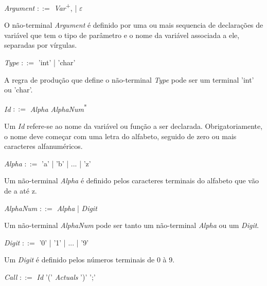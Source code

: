 \documentclass{scrreprt}
\begin{document}
\begin{center}
\textit{Argument }$::=$\textit{ Var}\textsuperscript{+}, | $\varepsilon$
\end{center}

\par O não-terminal \textit{Argument} é definido por uma ou mais sequencia de declarações de variável que tem o tipo de parâmetro e o nome da variável associada a ele, separadas por vírgulas.

\begin{center}
\textit{Type }$::=$ 'int' | 'char'
\end{center}

\par A regra de produção que define o não-terminal \textit{Type} pode ser um terminal 'int' ou 'char'.

\begin{center}
\textit{Id }$::=$\textit{ Alpha AlphaNum}\textsuperscript{*} 
\end{center}

\par Um \textit{Id} refere-se ao nome da variável ou função a ser declarada. Obrigatoriamente, o nome deve começar com uma letra do alfabeto, seguido de zero ou mais caracteres alfanuméricos.

\begin{center}
\textit{Alpha }$::=$ 'a' | 'b' | ... | 'z' 
\end{center}

\par Um não-terminal \textit{Alpha} é definido pelos caracteres terminais do alfabeto que vão de a até z. 

\begin{center}
\textit{AlphaNum }$::=$\textit{ Alpha }| \textit{Digit}
\end{center}

\par Um não-terminal \textit{AlphaNum} pode ser tanto um não-terminal \textit{Alpha} ou um \textit{Digit}.

\begin{center}
\textit{Digit }$::=$ '0' | '1' | ... | '9' 
\end{center}

\par Um \textit{Digit} é definido pelos números terminais de 0 à 9. 

\begin{center}
\textit{Call }$::=$\textit{ Id} '(' \textit{Actuals} ')' ';'
\end{center}
\end{document}
